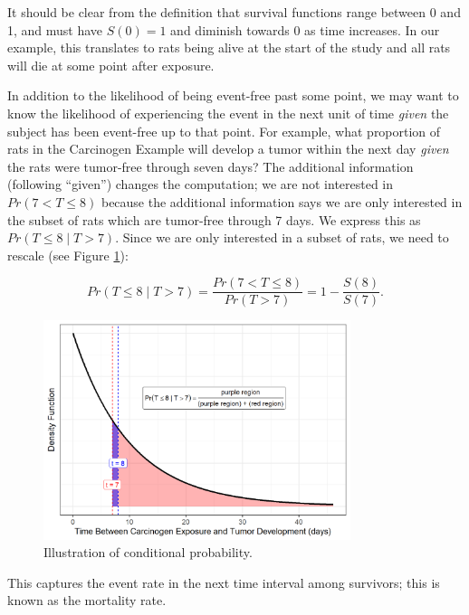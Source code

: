 \documentclass[
]{book}
\theoremstyle{plain}
\theoremstyle{mydefn}
\theoremstyle{myexmpl}
\theoremstyle{remark}
\begin{document}
It should be clear from the definition that survival functions range between 0 and 1, and must have \(S(0) = 1\) and diminish towards 0 as time increases. In our example, this translates to rats being alive at the start of the study and all rats will die at some point after exposure.

In addition to the likelihood of being event-free past some point, we may want to know the likelihood of experiencing the event in the next unit of time \emph{given} the subject has been event-free up to that point. For example, what proportion of rats in the Carcinogen Example will develop a tumor within the next day \emph{given} the rats were tumor-free through seven days? The additional information (following ``given'') changes the computation; we are not interested in \(Pr(7 < T \leq 8)\) because the additional information says we are only interested in the subset of rats which are tumor-free through 7 days. We express this as \(Pr(T \leq 8 \mid T > 7)\). Since we are only interested in a subset of rats, we need to rescale (see Figure \ref{fig:surv-conditional-probability}):

\[Pr(T \leq 8 \mid T > 7) = \frac{Pr(7 < T \leq 8)}{Pr(T > 7)} = 1 - \frac{S(8)}{S(7)}.\]

\begin{figure}

{\centering \includegraphics[width=0.8\textwidth]{./Images/surv-conditional-probability-1} 

}

\caption{Illustration of conditional probability.}\label{fig:surv-conditional-probability}
\end{figure}

This captures the event rate in the next time interval among survivors; this is known as the mortality rate.
\end{document}
